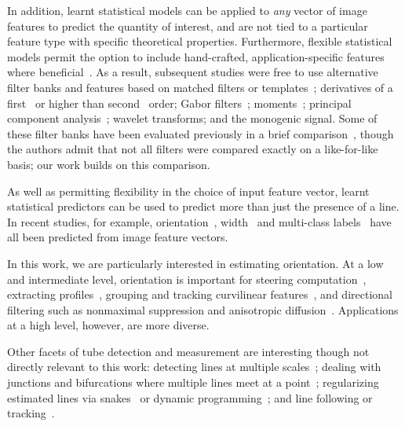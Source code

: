 In addition, learnt statistical models can be applied to \emph{any} vector of image features to predict the quantity of interest, and are not tied to a particular feature type with specific theoretical properties. Furthermore, flexible statistical models permit the option to include hand-crafted, application-specific features where beneficial~\cite{Staal_etal_TMI04}. As a result, subsequent studies were free to use alternative filter banks and features based on %
matched filters or templates~\cite{Chaudhuri_etal_TMI89,Pechaud_etal_CVPR09,Dixon_Taylor_IPC79,Hoover_etal_TMI00,Ricci_Perfetti_TMI07}; %
derivatives of a first~\cite{Cai_Chung_MICCAI06} or higher than second~\cite{Gonzalez_etal_CVPR09} order; %
Gabor filters~\cite{Soares_etal_TMI06,Dabbah_etal_MIA11}; %
moments~\cite{Marin_etal_TMI11}; %
principal component analysis~\cite{Minh_Hinton_ECCV10}; %
wavelet transforms; %
and the monogenic signal. %
Some of these filter banks have been evaluated previously in a brief comparison~\cite{Ayres_Rangayyan_JEI07}, though the authors admit that not all filters were compared exactly on a like-for-like basis; our work builds on this comparison.

As well as permitting flexibility in the choice of input feature vector, learnt statistical predictors can be used to predict more than just the presence of a line. In recent studies, for example, orientation~\cite{Zwiggelaar_etal_TMI04,Ayres_Rangayyan_JEI07}, width~\cite{Steger_TPAMI98,Zwiggelaar_etal_TMI04} and multi-class labels~\cite{Zwiggelaar_etal_TMI04} have all been predicted from image feature vectors.

In this work, we are particularly interested in estimating orientation. At a low and intermediate level, orientation is important for steering computation~\cite{Sonka_99}, extracting profiles~\cite{Zwiggelaar_etal_TMI04,Staal_etal_TMI04}, grouping and tracking curvilinear features~\cite{Aylward_Bullitt_TMI02}, and directional filtering such as nonmaximal suppression and anisotropic diffusion~\cite{Perona_PAMI90}. Applications at a high level, however, are more diverse. 

Other facets of tube detection and measurement are interesting though not directly relevant to this work: %
detecting lines at multiple scales~\cite{Lindeberg_IJCV98,Sato_etal_MIA98}; %
dealing with junctions and bifurcations where multiple lines meet at a point~\cite{Chen_etal_TPAMI00};
regularizing estimated lines via snakes~\cite{Laptev_etal_MVA00} or dynamic programming~\cite{Gruen}; %
and line following or tracking~\cite{Aylward_Bullitt_TMI02,Perez_etal_ICCV01}.

